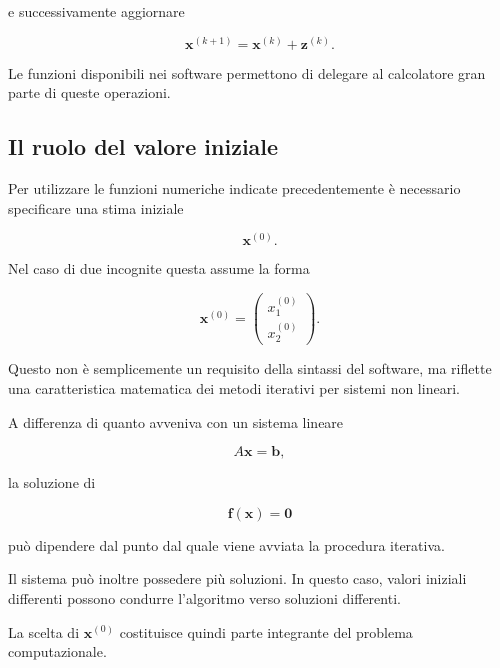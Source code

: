 e successivamente aggiornare

\begin{equation*}
    \mathbf{x}^{(k+1)}
    =
    \mathbf{x}^{(k)}
    +
    \mathbf{z}^{(k)}.
\end{equation*}

Le funzioni disponibili nei software permettono di delegare al
calcolatore gran parte di queste operazioni.


\subsection{Il ruolo del valore iniziale}

Per utilizzare le funzioni numeriche indicate precedentemente è
necessario specificare una stima iniziale

\begin{equation*}
    \mathbf{x}^{(0)}.
\end{equation*}

Nel caso di due incognite questa assume la forma

\begin{equation*}
    \mathbf{x}^{(0)}
    =
    \begin{pmatrix}
        x_1^{(0)}\\
        x_2^{(0)}
    \end{pmatrix}.
\end{equation*}

Questo non è semplicemente un requisito della sintassi del software,
ma riflette una caratteristica matematica dei metodi iterativi per
sistemi non lineari.

A differenza di quanto avveniva con un sistema lineare

\begin{equation*}
    A\mathbf{x}=\mathbf{b},
\end{equation*}

la soluzione di

\begin{equation*}
    \mathbf{f}(\mathbf{x})=\mathbf{0}
\end{equation*}

può dipendere dal punto dal quale viene avviata la procedura
iterativa.

Il sistema può inoltre possedere più soluzioni. In questo caso,
valori iniziali differenti possono condurre l'algoritmo verso
soluzioni differenti.

La scelta di $\mathbf{x}^{(0)}$ costituisce quindi parte integrante
del problema computazionale.


